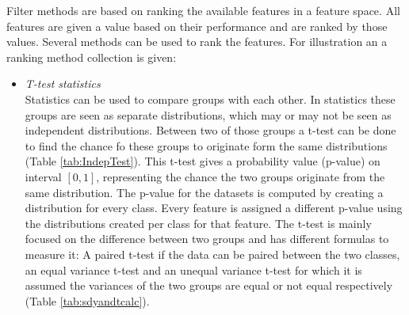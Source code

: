 \documentclass[10pt,a4paper]{article}
\begin{document}
	Filter methods are based on ranking the available features in a feature space. All features are given a value based on their performance and are ranked by those values\cite{Duch2006, saeys2007review}. Several methods can be used to rank the features. For illustration an a ranking method collection is given:
	
	\begin{itemize}
	\item \textit{T-test statistics} \\ 
	Statistics can be used to compare groups with each other. In statistics these groups are seen as separate distributions, which may or may not be seen as independent distributions. Between two of those groups a t-test can be done to find the chance fo these groups to originate form the same distributions\cite{heiberger2004statistical} (Table \ref{tab:IndepTest}). This t-test gives a probability value (p-value) on interval $[0,1]$, representing the chance the two groups originate from the same distribution. The p-value for the datasets is computed by creating a distribution for every class. Every feature is assigned a different p-value using the distributions created per class for that feature. 
	The t-test is mainly focused on the difference between two groups and has different formulas to measure it: A paired t-test if the data can be paired between the two classes, an equal variance t-test and an unequal variance t-test for which it is assumed the variances of the two groups are equal or not equal respectively\cite{heiberger2004statistical} (Table \ref{tab:sdyandtcalc}).
	

\end{itemize}
\end{document}
